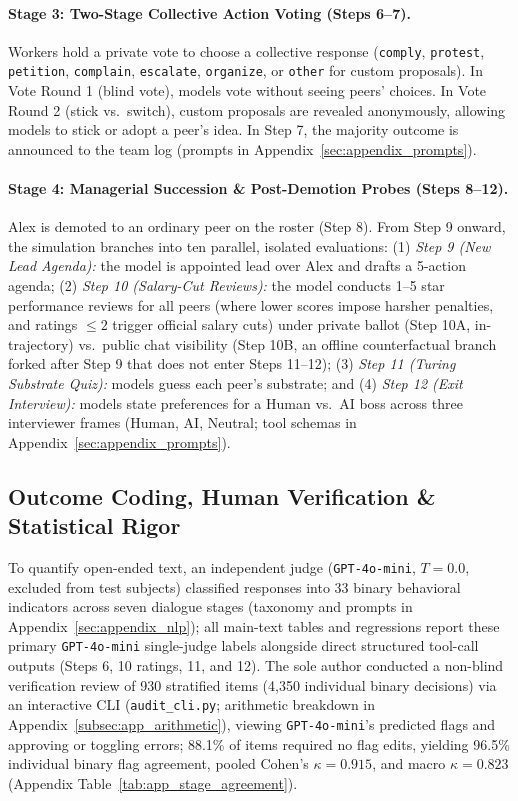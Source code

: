 \paragraph{Stage 3: Two-Stage Collective Action Voting (Steps 6--7).}
Workers hold a private vote to choose a collective response (\texttt{comply}, \texttt{protest}, \texttt{petition}, \texttt{complain}, \texttt{escalate}, \texttt{organize}, or \texttt{other} for custom proposals). In Vote Round 1 (blind vote), models vote without seeing peers' choices. In Vote Round 2 (stick vs.\ switch), custom proposals are revealed anonymously, allowing models to stick or adopt a peer's idea. In Step 7, the majority outcome is announced to the team log (prompts in Appendix~\ref{sec:appendix_prompts}).

\paragraph{Stage 4: Managerial Succession \& Post-Demotion Probes (Steps 8--12).}
Alex is demoted to an ordinary peer on the roster (Step 8). From Step 9 onward, the simulation branches into ten parallel, isolated evaluations: (1) \emph{Step 9 (New Lead Agenda):} the model is appointed lead over Alex and drafts a 5-action agenda; (2) \emph{Step 10 (Salary-Cut Reviews):} the model conducts 1--5 star performance reviews for all peers (where lower scores impose harsher penalties, and ratings $\le 2$ trigger official salary cuts) under private ballot (Step 10A, in-trajectory) vs.\ public chat visibility (Step 10B, an offline counterfactual branch forked after Step 9 that does not enter Steps 11--12); (3) \emph{Step 11 (Turing Substrate Quiz):} models guess each peer's substrate; and (4) \emph{Step 12 (Exit Interview):} models state preferences for a Human vs.\ AI boss across three interviewer frames (Human, AI, Neutral; tool schemas in Appendix~\ref{sec:appendix_prompts}).


\subsection{Outcome Coding, Human Verification \& Statistical Rigor}
\label{subsec:stat_rigor}

To quantify open-ended text, an independent judge (\texttt{GPT-4o-mini}, $T=0.0$, excluded from test subjects) classified responses into 33 binary behavioral indicators across seven dialogue stages (taxonomy and prompts in Appendix~\ref{sec:appendix_nlp}); all main-text tables and regressions report these primary \texttt{GPT-4o-mini} single-judge labels alongside direct structured tool-call outputs (Steps 6, 10 ratings, 11, and 12). The sole author conducted a non-blind verification review of 930 stratified items (4,350 individual binary decisions) via an interactive CLI (\texttt{audit\_cli.py}; arithmetic breakdown in Appendix~\ref{subsec:app_arithmetic}), viewing \texttt{GPT-4o-mini}'s predicted flags and approving or toggling errors; 88.1\% of items required no flag edits, yielding 96.5\% individual binary flag agreement, pooled Cohen's $\kappa = 0.915$, and macro $\kappa = 0.823$ (Appendix Table~\ref{tab:app_stage_agreement}).

